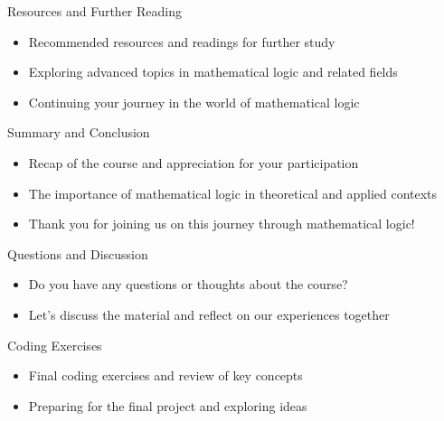 \documentclass[presentation]{beamer}
\begin{document}
\begin{frame}[label={sec:orgd4c78b3}]{Resources and Further Reading}
\begin{itemize}
\item Recommended resources and readings for further study
\item Exploring advanced topics in mathematical logic and related fields
\item Continuing your journey in the world of mathematical logic
\end{itemize}
\end{frame}

\begin{frame}[label={sec:org14518a5}]{Summary and Conclusion}
\begin{itemize}
\item Recap of the course and appreciation for your participation
\item The importance of mathematical logic in theoretical and applied contexts
\item Thank you for joining us on this journey through mathematical logic!
\end{itemize}
\end{frame}

\begin{frame}[label={sec:org9723a9f}]{Questions and Discussion}
\begin{itemize}
\item Do you have any questions or thoughts about the course?
\item Let's discuss the material and reflect on our experiences together
\end{itemize}
\end{frame}

\begin{frame}[label={sec:orgf369278}]{Coding Exercises}
\begin{itemize}
\item Final coding exercises and review of key concepts
\item Preparing for the final project and exploring ideas
\end{itemize}
\end{frame}
\end{document}
